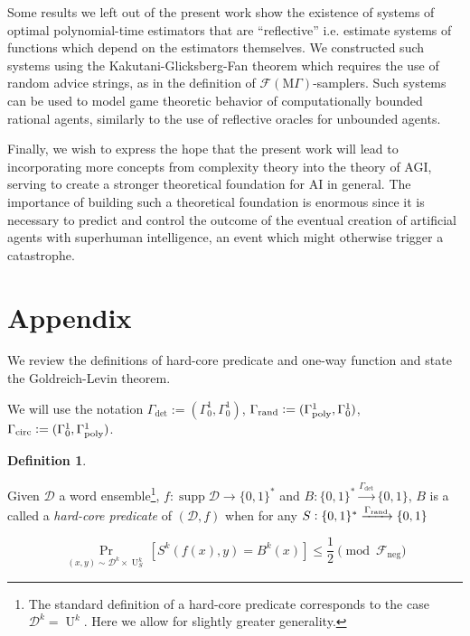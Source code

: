 \documentclass[11pt]{article}
\numberwithin{equation}{section}
\theoremstyle{definition}
\newtheorem{definition}{Definition}[section]
\theoremstyle{plain}
\newcommand{\Bool}{\{0,1\}}
\newcommand{\Words}{{\Bool^*}}
\DeclareMathOperator{\Supp}{supp}
\DeclareMathOperator{\Prb}{Pr}
\DeclareMathOperator{\Un}{U}
\newcommand{\Dist}{\mathcal{D}}
\newcommand{\MGrow}{\mathrm{M}\Gamma}
\newcommand{\Fall}{\mathcal{F}}
\newcommand{\EMG}{\Fall(\MGrow)}
\newcommand{\GammaPoly}{\Gamma_{\textnormal{poly}}}
\begin{document}
Some results we left out of the present work show the existence of systems of optimal polynomial-time estimators that are \enquote{reflective} i.e. estimate systems of functions which depend on the estimators themselves. We constructed such systems using the Kakutani-Glicksberg-Fan theorem which requires the use of random advice strings, as in the definition of ${\EMG}$-samplers. Such systems can be used to model game theoretic behavior of computationally bounded rational agents, similarly to the use of reflective oracles\cite{Fallenstein_2015} for unbounded agents. 

Finally, we wish to express the hope that the present work will lead to incorporating more concepts from complexity theory into the theory of AGI, serving to create a stronger theoretical foundation for AI in general. The importance of building such a theoretical foundation is enormous since it is necessary to predict and control the outcome of the eventual creation of artificial agents with superhuman intelligence, an event which might otherwise trigger a catastrophe\cite{Bostrom_2014}.


\appendix

\section{Appendix}

We review the definitions of hard-core predicate and one-way function and state the Goldreich-Levin theorem.

We will use the notation $\Gamma_{\text{det}}:=(\Gamma_0^1,\Gamma_0^1)$, $\Gamma_{\text{rand}}:=(\GammaPoly^1,\Gamma_0^1)$, ${\Gamma_{\text{circ}}:=(\Gamma_0^1,\GammaPoly^1)}$.

\begin{samepage}
\begin{definition}
\label{def:hard_core}

Given $\Dist$ a word ensemble\footnote{The standard definition of a hard-core predicate corresponds to the case $\Dist^k=\Un^k$. Here we allow for slightly greater generality.}, $f: \Supp \Dist \rightarrow \Words$ and ${B: \Words \xrightarrow{\Gamma_{\text{det}}} \Bool}$, $B$ is a called a \emph{hard-core predicate} of $(\Dist,f)$ when for any $S: \Words \xrightarrow{\Gamma_{\textnormal{rand}}} \Bool$

\begin{equation}
\Prb_{(x,y) \sim \Dist^k \times \Un_S^k}[S^k(f(x),y)=B^k(x)] \leq \frac{1}{2} \pmod {\Fall_{\text{neg}}}
\end{equation}

\end{definition}
\end{samepage}
\end{document}
